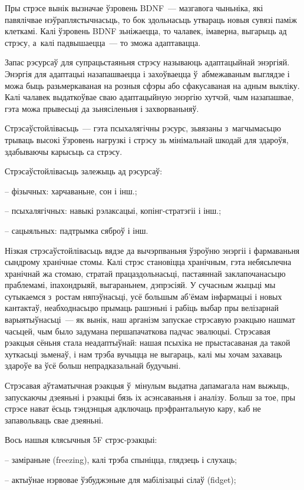 Пры стрэсе вынік вызначае ўзровень BDNF~--- мазгавога чыньніка, які павялічвае нэўраплястычнасьць, то бок здольнасьць утвараць новыя сувязі паміж клеткамі. Калі ўзровень BDNF зьніжаецца, то чалавек, імаверна, выгарыць ад стрэсу, а~калі падвышаецца~--- то зможа адаптавацца.

Запас рэсурсаў для супрацьстаяньня стрэсу называюць адаптацыйнай энэргіяй. Энэргія для адаптацыі назапашваецца і захоўваецца ў~абмежаваным выглядзе і можа быць разьмеркаваная на розныя сфэры або сфакусаваная на адным выкліку. Калі чалавек выдаткоўвае сваю адаптацыйную энэргію хутчэй, чым назапашвае, гэта можа прывесьці да зьнясіленьня і захворваньняў.

Стрэсаўстойлівасьць~--- гэта псыхалягічны рэсурс, зьвязаны з~магчымасьцю трываць высокі ўзровень нагрузкі і стрэсу зь мінімальнай шкодай для здароўя, здабываючы карысьць са стрэсу. 

Стрэсаўстойлівасьць залежыць ад рэсурсаў: 

– фізычных: харчаваньне, сон і інш.;

– псыхалягічных: навыкі рэлаксацыі, копінг-стратэгіі і інш.;

– сацыяльных: падтрымка сяброў і інш.

Нізкая стрэсаўстойлівасьць вядзе да вычэрпваньня ўзроўню энэргіі і фармаваньня сындрому хранічнае стомы. Калі стрэс становіцца хранічным, гэта небясьпечна хранічнай жа стомаю, стратай працаздольнасьці, пастаяннай заклапочанасьцю праблемамі, іпахондрыяй, выгараньнем, дэпрэсіяй. У сучасным жыцьці мы сутыкаемся з~ростам няпэўнасьці, усё большым аб'ёмам інфармацыі і новых кантактаў, неабходнасьцю прымаць рашэньні і рабіць выбар пры велізарнай варыятыўнасьці~--- як вынік, наш арганізм запускае стрэсавую рэакцыю нашмат часьцей, чым было задумана першапачаткова падчас эвалюцыі. Стрэсавая рэакцыя сёньня стала неадаптыўнай: нашая псыхіка не прыстасаваная да такой хуткасьці зьменаў, і нам трэба вучыцца не выгараць, калі мы хочам захаваць здароўе ва ўсё больш непрадказальнай будучыні.

Стрэсавая аўтаматычная рэакцыя ў~мінулым выдатна дапамагала нам выжыць, запускаючы дзеяньні і рэакцыі бязь іх асэнсаваньня і аналізу. Больш за тое, пры стрэсе нават ёсьць тэндэнцыя адключаць прэфрантальную кару, каб не запавольваць свае дзеяньні. 

Вось нашыя клясычныя 5F стрэс-рэакцыі: 

– заміраньне (freezing), калі трэба спыніцца, глядзець і слухаць;

– актыўнае нэрвовае ўзбуджэньне для мабілізацыі сілаў (fidget);


